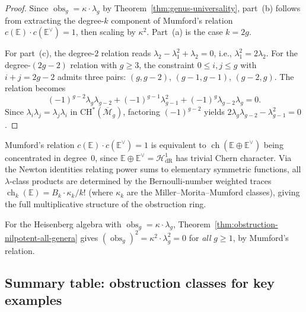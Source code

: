\begin{proof}
Since $\operatorname{obs}_g = \kappa \cdot \lambda_g$ by
Theorem~\ref{thm:genus-universality}, part~(b) follows from extracting
the degree-$k$ component of Mumford's relation
$c(\mathbb{E}) \cdot c(\mathbb{E}^\vee) = 1$, then scaling by
$\kappa^2$.  Part~(a) is the case $k = 2g$.

For part~(c), the degree-$2$ relation reads
$\lambda_2 - \lambda_1^2 + \lambda_2 = 0$, i.e.,
$\lambda_1^2 = 2\lambda_2$.  For the degree-$(2g-2)$ relation with
$g \geq 3$, the constraint $0 \leq i,j \leq g$ with $i + j = 2g - 2$
admits three pairs: $(g, g-2)$, $(g-1, g-1)$, $(g-2, g)$.
The relation becomes
\[
(-1)^{g-2}\lambda_g \lambda_{g-2}
+ (-1)^{g-1}\lambda_{g-1}^2
+ (-1)^{g}\lambda_{g-2}\lambda_g = 0.
\]
Since $\lambda_i \lambda_j = \lambda_j \lambda_i$ in
$\mathrm{CH}^*(\overline{\mathcal{M}}_g)$, factoring
$(-1)^{g-2}$ yields
$2\lambda_g \lambda_{g-2} - \lambda_{g-1}^2 = 0$.
\end{proof}

\begin{remark}
\label{rem:chern-character-mumford}
Mumford's relation $c(\mathbb{E}) \cdot c(\mathbb{E}^\vee) = 1$
is equivalent to $\operatorname{ch}(\mathbb{E} \oplus \mathbb{E}^\vee)$ being
concentrated in degree~$0$, since $\mathbb{E} \oplus \mathbb{E}^\vee
= \mathcal{H}^1_{\mathrm{dR}}$ has trivial Chern character.
Via the Newton identities relating power sums to elementary symmetric
functions, all $\lambda$-class products are determined by the
Bernoulli-number weighted traces
$\operatorname{ch}_k(\mathbb{E}) = B_k \cdot \kappa_k / k!$
(where $\kappa_k$ are the Miller--Morita--Mumford classes),
giving the full multiplicative structure of the obstruction ring.
\end{remark}

\begin{example}\label{ex:heisenberg-obs-squares}
For the Heisenberg algebra with
$\operatorname{obs}_g = \kappa \cdot \lambda_g$,
Theorem~\ref{thm:obstruction-nilpotent-all-genera} gives
$(\operatorname{obs}_g)^2 = \kappa^2 \cdot \lambda_g^2 = 0$
for \emph{all} $g \geq 1$, by Mumford's relation.
\end{example}

\subsection{Summary table: obstruction classes for key examples}
\label{subsec:obstruction-summary-table}


